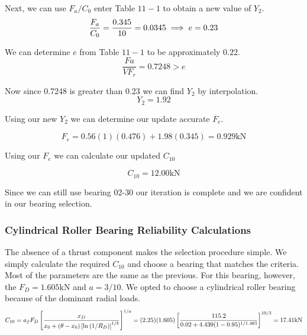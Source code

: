 \documentclass[letterpaper,12pt]{article}
\begin{document}
\noindent Next, we can use $F _ { a } / C _ { 0 }$ enter Table $11 - 1$ to obtain a new value of $Y _ { 2 }$. \\ 
\begin{equation}
\notag
\frac { F _a } { C _ { 0 } } = \frac { 0.345 } { 10 } = 0.0345 \implies e = 0.23
\end{equation}

\noindent We can determine $e$ from Table $11 - 1$ to be approximately $0.22 .$ \\
\begin{equation}
\frac { F a } { V F _ { r } } = 0.7248 > e
\end{equation}

\noindent Now since 0.7248 is greater than 0.23 we can find $Y _ { 2 }$ by interpolation. \\
\begin{equation}
    Y_2 = 1.92
\end{equation}

\noindent Using our new $Y_2$ we can determine our update accurate $F_e$.

\begin{equation}
F_e = 0.56 ( 1 )( 0.476 ) + 1.98( 0.345 ) = 0.929 \mathrm{kN}
\end{equation}

\noindent Using our $F_e$ we can calculate our updated $C_{10}$

\begin{equation}
    C _ { 10 } = 12.00 \mathrm { kN }
\end{equation}

\noindent Since we can still use bearing 02-30 our iteration is complete and we are confident in our bearing selection.

\subsubsection{Cylindrical Roller Bearing Reliability Calculations}

The absence of a thrust component makes the selection procedure simple. We simply calculate the required $C_{10}$ and choose a bearing that matches the criteria. Most of the parameters are the same as the previous. For this bearing, however, the $F_D = 1.605 \mathrm{kN}$ and $a = 3/10$. We opted to choose a cylindrical roller bearing because of the dominant radial loads. \\

\begin{equation}
    \notag
C _ { 10 } = a _ { f } F _ { D } \left[ \frac { x _ { D } } { x _ { 0 } + \left( \theta - x _ { 0 } \right) \left[ \ln \left( 1 / R _ { D } \right) \right] ^ { 1 / b } } \right] ^ { 1 / a } = ( 2.25 ) ( 1.605 ) \left[ \frac { 115.2 } { 0.02 + 4.439 ( 1 - 0.95 ) ^ { 1 / 1.483 } } \right] ^ { 10 / 3 } = 17.41 \mathrm { kN } \\ 
\end{equation}
\end{document}
